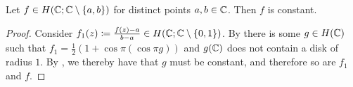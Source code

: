 \begin{theorem} \label{thm:picard-little}
    Let $f \in H(\mathbb{C}; \mathbb{C} \setminus \{ a, b \})$ for distinct points $a, b \in \mathbb{C}$. Then $f$ is constant.
\end{theorem}

\begin{proof}
    Consider $f_1(z) \coloneqq \frac{f(z) - a}{b - a} \in H(\mathbb{C}; \mathbb{C} \setminus \{ 0, 1 \})$. By  there is some $g \in H(\mathbb{C})$ such that $f_1 = \frac{1}{2}(1 + \cos \pi (\cos \pi g))$ and $g(\mathbb{C})$ does not contain a disk of radius $1$. By , we thereby have that $g$ must be constant, and therefore so are $f_1$ and $f$.
\end{proof}